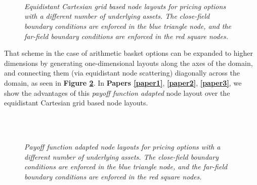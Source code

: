 \documentclass{UUThesisTemplate}
\begin{document}
\begin{figure}[H]
\centering
\\
\vspace{11pt}
\\
\vspace{11pt}
\\
\caption{\emph{Equidistant Cartesian grid based node layouts for pricing options with a different number of underlying assets. The close-field boundary conditions are enforced in the blue triangle node, and the far-field boundary conditions are enforced in the red square nodes.}}
\label{fig:gridreg}
\end{figure}
\noindent That scheme in the case of arithmetic basket options can be expanded to higher dimensions by generating one-dimensional layouts along the axes of the domain, and connecting them (via equidistant node scattering) diagonally across the domain, as seen in \textbf{Figure \ref{fig:gridadap}}. In \textbf{Papers \ref{paper1}}, \textbf{\ref{paper2}}, \textbf{\ref{paper3}}, we show the advantages of this \emph{payoff function adapted} node layout over the equidistant Cartesian grid based node layouts.   

\begin{figure}[H]
\centering
\\
\vspace{11pt}
\\
\caption{\emph{Payoff function adapted node layouts for pricing options with a different number of underlying assets. The close-field boundary conditions are enforced in the blue triangle node, and the far-field boundary conditions are enforced in the red square nodes.}}
\label{fig:gridadap}
\end{figure}
\end{document}

